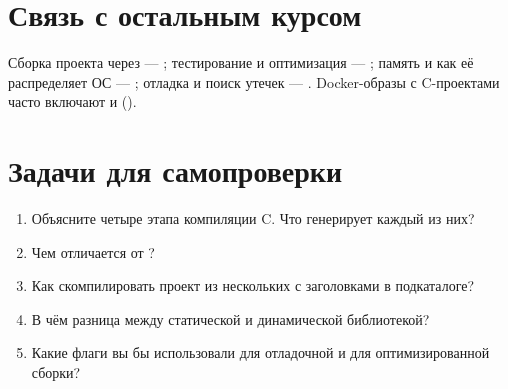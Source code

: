 \section{Связь с остальным курсом}

Сборка проекта через  --- ;
тестирование и оптимизация --- ;
память и как её распределяет ОС ---
; отладка и поиск утечек ---
. Docker-образы с C-проектами
часто включают  и 
().

\section{Задачи для самопроверки}
\begin{enumerate}
  \item Объясните четыре этапа компиляции C. Что
    генерирует каждый из них?
  \item Чем  отличается от ?
  \item Как скомпилировать проект из нескольких
     с заголовками в подкаталоге?
  \item В чём разница между статической и динамической
    библиотекой?
  \item Какие флаги вы бы использовали для отладочной
    и для оптимизированной сборки?
\end{enumerate}
